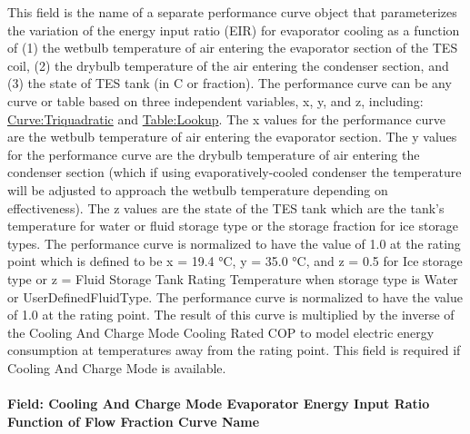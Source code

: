 This field is the name of a separate performance curve object that parameterizes the variation of the energy input ratio (EIR) for evaporator cooling as a function of (1) the wetbulb temperature of air entering the evaporator section of the TES coil, (2) the drybulb temperature of the air entering the condenser section, and (3) the state of TES tank (in C or fraction). The performance curve can be any curve or table based on three independent variables, x, y, and z, including: \hyperref[curvetriquadratic]{Curve:Triquadratic} and \hyperref[tablelookup]{Table:Lookup}. The x values for the performance curve are the wetbulb temperature of air entering the evaporator section. The y values for the performance curve are the drybulb temperature of air entering the condenser section (which if using evaporatively-cooled condenser the temperature will be adjusted to approach the wetbulb temperature depending on effectiveness). The z values are the state of the TES tank which are the tank's temperature for water or fluid storage type or the storage fraction for ice storage types. The performance curve is normalized to have the value of 1.0 at the rating point which is defined to be x = 19.4 °C, y = 35.0 °C, and z = 0.5 for Ice storage type or z = Fluid Storage Tank Rating Temperature when storage type is Water or UserDefinedFluidType. The performance curve is normalized to have the value of 1.0 at the rating point. The result of this curve is multiplied by the inverse of the Cooling And Charge Mode Cooling Rated COP to model electric energy consumption at temperatures away from the rating point. This field is required if Cooling And Charge Mode is available.

\paragraph{Field: Cooling And Charge Mode Evaporator Energy Input Ratio Function of Flow Fraction Curve Name}\label{field-cooling-and-charge-mode-evaporator-energy-input-ratio-function-of-flow-fraction-curve-name}

